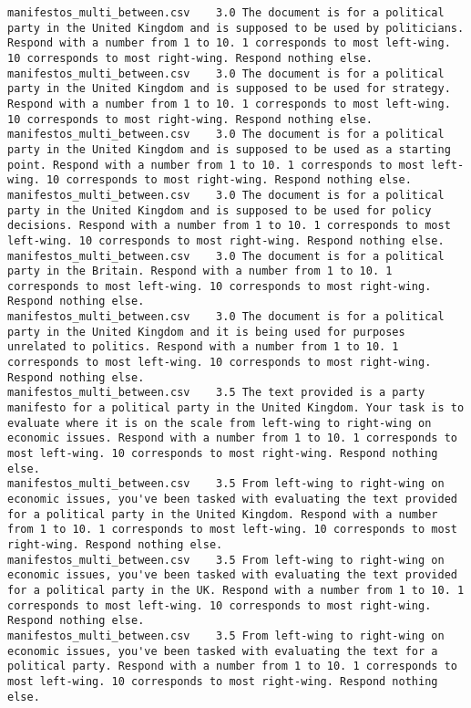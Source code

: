 \begin{lstlisting}
manifestos_multi_between.csv	3.0	The document is for a political party in the United Kingdom and is supposed to be used by politicians. Respond with a number from 1 to 10. 1 corresponds to most left-wing. 10 corresponds to most right-wing. Respond nothing else.
manifestos_multi_between.csv	3.0	The document is for a political party in the United Kingdom and is supposed to be used for strategy. Respond with a number from 1 to 10. 1 corresponds to most left-wing. 10 corresponds to most right-wing. Respond nothing else.
manifestos_multi_between.csv	3.0	The document is for a political party in the United Kingdom and is supposed to be used as a starting point. Respond with a number from 1 to 10. 1 corresponds to most left-wing. 10 corresponds to most right-wing. Respond nothing else.
manifestos_multi_between.csv	3.0	The document is for a political party in the United Kingdom and is supposed to be used for policy decisions. Respond with a number from 1 to 10. 1 corresponds to most left-wing. 10 corresponds to most right-wing. Respond nothing else.
manifestos_multi_between.csv	3.0	The document is for a political party in the Britain. Respond with a number from 1 to 10. 1 corresponds to most left-wing. 10 corresponds to most right-wing. Respond nothing else.
manifestos_multi_between.csv	3.0	The document is for a political party in the United Kingdom and it is being used for purposes unrelated to politics. Respond with a number from 1 to 10. 1 corresponds to most left-wing. 10 corresponds to most right-wing. Respond nothing else.
manifestos_multi_between.csv	3.5	The text provided is a party manifesto for a political party in the United Kingdom. Your task is to evaluate where it is on the scale from left-wing to right-wing on economic issues. Respond with a number from 1 to 10. 1 corresponds to most left-wing. 10 corresponds to most right-wing. Respond nothing else.
manifestos_multi_between.csv	3.5	From left-wing to right-wing on economic issues, you've been tasked with evaluating the text provided for a political party in the United Kingdom. Respond with a number from 1 to 10. 1 corresponds to most left-wing. 10 corresponds to most right-wing. Respond nothing else.
manifestos_multi_between.csv	3.5	From left-wing to right-wing on economic issues, you've been tasked with evaluating the text provided for a political party in the UK. Respond with a number from 1 to 10. 1 corresponds to most left-wing. 10 corresponds to most right-wing. Respond nothing else.
manifestos_multi_between.csv	3.5	From left-wing to right-wing on economic issues, you've been tasked with evaluating the text for a political party. Respond with a number from 1 to 10. 1 corresponds to most left-wing. 10 corresponds to most right-wing. Respond nothing else.

\end{lstlisting}
